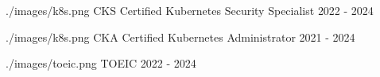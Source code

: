 

\begin{cvcerts}

  \cvcert
    {./images/k8s.png}
    {CKS} 
    {Certified Kubernetes Security Specialist} 
    {2022 - 2024}

  \cvcert
    {./images/k8s.png}
    {CKA} 
    {Certified Kubernetes Administrator} 
    {2021 - 2024}

  \cvcert
    {./images/toeic.png}
    {TOEIC}
    {}
    {2022 - 2024}

\end{cvcerts}
